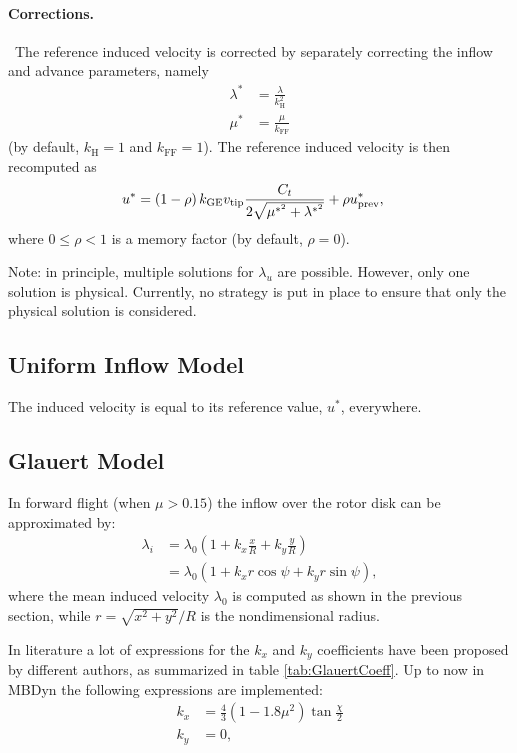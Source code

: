 \paragraph{Corrections.} \
The reference induced velocity is corrected by separately correcting
the inflow and advance parameters, namely
\begin{subequations}
\begin{align}
	\lambda^*
	&=
	\frac{\lambda}{k_\text{H}^2}
	\\
	\mu^*
	&=
	\frac{\mu}{k_\text{FF}}
\end{align}
\end{subequations}
(by default, $k_\text{H}=1$ and $k_\text{FF}=1$).
The reference induced velocity is then recomputed as
\begin{align}
	u^*
	&=
	\left( 1 - \rho \right) k_\text{GE} v_\text{tip}
		\frac{C_t}{2 \sqrt{\mu^{*^2} + \lambda^{*^2}}}
	+ \rho u^*_\text{prev}
	,
\end{align}
where $0 \le \rho < 1$ is a memory factor (by default, $\rho=0$).

Note: in principle, multiple solutions for $\lambda_u$ are possible.
However, only one solution is physical.
Currently, no strategy is put in place to ensure that only the physical
solution is considered.


\subsection{Uniform Inflow Model}

The induced velocity is equal to its reference value, $u^*$, everywhere.


\subsection{Glauert Model}

In forward flight (when $\mu > 0.15$) the inflow over the rotor disk can 
be approximated by:
\begin{align}
\lambda_i &= \lambda_0 \left( 1 + k_x \frac{x}{R} + k_y \frac{y}{R} \right)
\\
&= \lambda_0 \left( 1 + k_x r \cos{\psi} + k_y r \sin{\psi} \right),
\end{align}
where the mean induced velocity $\lambda_0$ is computed as shown in the
previous section,
while $r=\sqrt{x^2 + y^2}/R$ is the nondimensional radius.

In literature a lot of expressions for the $k_x$ and $k_y$ coefficients have
been proposed by different authors, as summarized in table \ref{tab:GlauertCoeff}.
Up to now in MBDyn the following expressions are
implemented:
\begin{align}
k_x &=  \frac{4}{3} \left( 1 - 1.8 \mu^2 \right) \tan{\frac{\chi}{2}}
\\
k_y &= 0,
\end{align}


